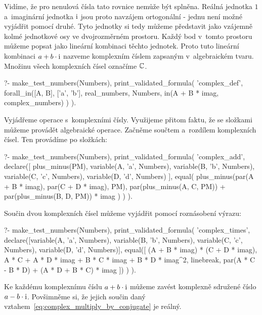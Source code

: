 Vidíme, že pro nenulová čísla tato rovnice nemůže být splněna. Reálná jednotka \(1\) a~imaginární jednotka \(\mathrm{i}\) jsou proto navzájem ortogonální - jednu není možné vyjádřit pomocí druhé. Tyto jednotky si tedy můžeme představit jako vzájemně kolmé jednotkové osy ve dvojrozměrném prostoru. Každý bod v~tomto prostoru můžeme popsat jako lineární kombinaci těchto jednotek. Proto tuto lineární kombinaci \(a + b \cdot \mathrm{i}\) nazveme komplexním číslem zapsaným v~algebraickém tvaru. Množinu všech komplexních čísel označíme \(\mathbb{C}\).

\begin{fact}
\begin{prolog}
?-	make_test_numbers(Numbers),
	print_validated_formula(
		'complex_def',
		forall_in([A, B], ['a', 'b'], real_numbers, Numbers,
			in(A + B * imag, complex_numbers)
		)
	).
\end{prolog}
\end{fact}

Vyjádřeme operace s~komplexními čísly. Využijeme přitom faktu, že se složkami můžeme provádět algebraické operace. Začněme součtem a~rozdílem komplexních čísel. Ten provádíme po složkách:

\begin{prolog}
?-	make_test_numbers(Numbers),
	print_validated_formula(
		'complex_add',
		declare([
			plus_minus(PM), variable(A, 'a', Numbers), variable(B, 'b', Numbers),
			variable(C, 'c', Numbers), variable(D, 'd', Numbers)
		],
			equal(
				plus_minus(par(A + B * imag), par(C + D * imag), PM),
				par(plus_minus(A, C, PM)) + par(plus_minus(B, D, PM)) * imag
			)
		)
	).
\end{prolog}

Součin dvou komplexních čísel můžeme vyjádřit pomocí roznásobení výrazu:

\begin{prolog}
?-	make_test_numbers(Numbers),
	print_validated_formula(
		'complex_times',
		declare([variable(A, 'a', Numbers), variable(B, 'b', Numbers), variable(C, 'c', Numbers), variable(D, 'd', Numbers)],
			equal([
				(A + B * imag) * (C + D * imag),
				A * C + A * D * imag + B * C * imag + B * D * imag^2,
				linebreak,
				par(A * C - B * D) + (A * D  + B * C) * imag
			])
		)
	).
\end{prolog}

Ke každému komplexnímu číslu \(a + b \cdot \mathrm{i}\) můžeme zavést komplexně sdružené číslo \(a - b \cdot \mathrm{i}\). Povšimněme si, že jejich součin daný vztahem~\eqref{eq:complex_multiply_by_conjugate} je reálný.

